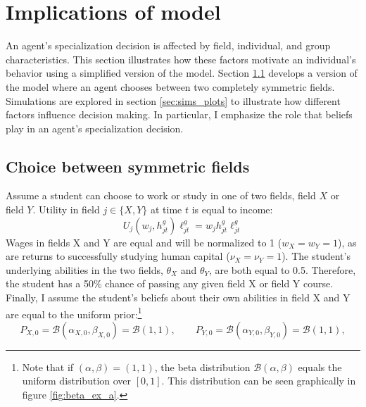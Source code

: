 \documentclass[11 pt]{article}
\begin{document}
\section{Implications of model}\label{sec:sims}

An agent's specialization decision is affected by field, individual, and group characteristics.
This section illustrates how these factors motivate an individual's behavior using a simplified version of the model.
Section \ref{sec:sims_prelims} develops a version of the model where an agent chooses between two completely symmetric fields. 
Simulations are explored in section \ref{sec:sims_plots} to illustrate how different factors influence decision making.
In particular, I emphasize the role that beliefs play in an agent's specialization decision. 

\subsection{Choice between symmetric fields}\label{sec:sims_prelims}


Assume a student can choose to work or study in one of two fields, field $X$ or field $Y$. 
Utility in field $j \in \{X, Y\}$ at time $t$ is equal to income: 
\begin{equation}\label{eq:linear_utility}
    U_j(w_j, h_{jt}^g) \ell_{jt}^g = w_j h_{jt}^g \ell_{jt}^g
\end{equation}
Wages in fields X and Y are equal and will be normalized to 1 ($w_X = w_Y = 1$), as are returns to successfully studying human capital ($\nu_X = \nu_Y = 1$).
The student's underlying abilities in the two fields, $\theta_X$ and $\theta_Y$, are both equal to 0.5. Therefore, the student has a 50\% chance of passing any given field X or field Y course.
Finally, I assume the student's beliefs about their own abilities in field X and Y are equal to the uniform prior:\footnote{
    Note that if $(\alpha, \beta) = (1, 1)$, the beta distribution $\mathcal{B} (\alpha, \beta)$ equals the uniform distribution over $[0, 1]$. This distribution can be seen graphically in figure \ref{fig:beta_ex_a}.
}
\begin{equation*}
    P_{X,0} = \mathcal{B}(\alpha_{X, 0}, \beta_{X, 0}) = \mathcal{B} (1, 1), 
    \quad \quad 
    P_{Y,0} = \mathcal{B}(\alpha_{Y, 0}, \beta_{Y, 0}) = \mathcal{B} (1, 1), 
\end{equation*}
\end{document}
